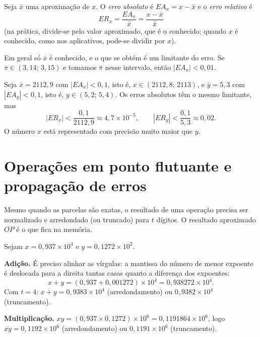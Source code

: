\begin{definicao}
Seja $\bar x$ uma aproximação de $x$. O \emph{erro absoluto} é $EA_x=x-\bar x$ e o \emph{erro relativo} é
\[
ER_x=\frac{EA_x}{\bar x}=\frac{x-\bar x}{\bar x}
\]
(na prática, divide-se pelo valor aproximado, que é o conhecido; quando $x$ é conhecido, como nos aplicativos,
pode-se dividir por $x$).
\end{definicao}

Em geral só $\bar x$ é conhecido, e o que se obtém é um limitante do erro. Se
$\pi\in(3{,}14;\,3{,}15)$ e tomamos $\bar\pi$ nesse intervalo, então $|EA_\pi|<0{,}01$.

\begin{exemplo}
Seja $\bar x=2112{,}9$ com $|EA_x|<0{,}1$, isto é, $x\in(2112{,}8;\,2113)$, e $\bar y=5{,}3$ com
$|EA_y|<0{,}1$, isto é, $y\in(5{,}2;\,5{,}4)$. Os erros absolutos têm o mesmo limitante, mas
\[
|ER_x|<\frac{0{,}1}{2112{,}9}\approx4{,}7\times10^{-5},\qquad |ER_y|<\frac{0{,}1}{5{,}3}\approx0{,}02 .
\]
O número $x$ está representado com precisão muito maior que $y$.
\end{exemplo}

\section{Operações em ponto flutuante e propagação de erros}

Mesmo quando as parcelas são exatas, o resultado de uma operação precisa ser normalizado e arredondado (ou
truncado) para $t$ dígitos. O resultado aproximado $\overline{OP}$ é o que fica na memória.

\begin{exemplo}[{: adição e multiplicação com $t=4$}]
Sejam $x=0{,}937\times10^{4}$ e $y=0{,}1272\times10^{2}$.

\textbf{Adição.} É preciso alinhar as vírgulas: a mantissa do número de menor expoente é deslocada para a
direita tantas casas quanto a diferença dos expoentes:
\[
x+y=(0{,}937+0{,}001272)\times10^{4}=0{,}938272\times10^{4} .
\]
Com $t=4$: $\overline{x+y}=0{,}9383\times10^{4}$ (arredondamento) ou $0{,}9382\times10^{4}$ (truncamento).

\textbf{Multiplicação.}
$xy=(0{,}937\times0{,}1272)\times10^{6}=0{,}1191864\times10^{6}$, logo
$\overline{xy}=0{,}1192\times10^{6}$ (arredondamento) ou $0{,}1191\times10^{6}$ (truncamento).
\end{exemplo}

